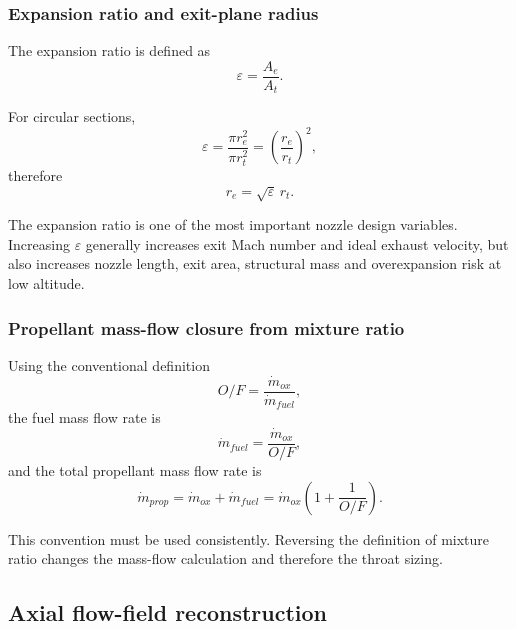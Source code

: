 \subsubsection{Expansion ratio and exit-plane radius}

The expansion ratio is defined as
\begin{equation}
\varepsilon=\frac{A_e}{A_t} .
\label{eq:expansion_ratio}
\end{equation}

For circular sections,
\begin{equation}
\varepsilon=\frac{\pi r_e^2}{\pi r_t^2}=\left(\frac{r_e}{r_t}\right)^2,
\end{equation}
therefore
\begin{equation}
r_e=\sqrt{\varepsilon}\,r_t .
\label{eq:exit_radius}
\end{equation}

The expansion ratio is one of the most important nozzle design variables. Increasing $\varepsilon$ generally increases exit Mach number and ideal exhaust velocity, but also increases nozzle length, exit area, structural mass and overexpansion risk at low altitude.

\subsubsection{Propellant mass-flow closure from mixture ratio}

Using the conventional definition
\begin{equation}
O/F=\frac{\dot{m}_{ox}}{\dot{m}_{fuel}},
\end{equation}
the fuel mass flow rate is
\begin{equation}
\dot{m}_{fuel}=\frac{\dot{m}_{ox}}{O/F},
\end{equation}
and the total propellant mass flow rate is
\begin{equation}
\dot{m}_{prop}=\dot{m}_{ox}+\dot{m}_{fuel}
=\dot{m}_{ox}\left(1+\frac{1}{O/F}\right).
\label{eq:mdot_total}
\end{equation}

This convention must be used consistently. Reversing the definition of mixture ratio changes the mass-flow calculation and therefore the throat sizing.

% 

\subsection{Axial flow-field reconstruction}


